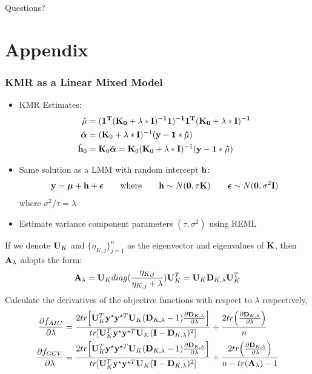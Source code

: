\documentclass{beamer}
\begin{document}
\begin{frame}
\begin{center}
Questions?
\end{center}
\end{frame}


\section{Appendix}

\begin{frame}
\label{est}
\frametitle{KMR as a Linear Mixed Model}
\begin{itemize}
\item KMR Estimates:
\begin{align*}
\hat{\mu} &= (\bf{1}^T ({\bf K}_0 + \lambda * {\bf I})^{-1} \bf{1} )^{-1} 
\bf{1}^T ({\bf K}_0 + \lambda * {\bf I})^{-1} \\
\hat{\boldsymbol{\alpha}} &= ({\bf K}_0 + \lambda * {\bf I})^{-1} ({\bf y} - \bf{1}* \hat{\mu})\\
\hat{{\bf h}}_0 &= {\bf K}_0\hat{\boldsymbol{\alpha}} = 
{\bf K}_0({\bf K}_0 + \lambda * {\bf I})^{-1} ({\bf y} - \bf{1}* \hat{\mu})
\end{align*}
\item Same solution as a LMM with random intercept ${\bf h}$:
\begin{align*}
{\bf y} = \boldsymbol{\mu} + {\bf h} + \boldsymbol{\epsilon} 
\qquad \mbox{where} \qquad
{\bf h} \sim N({\bf 0}, \tau {\bf K}) \qquad 
\boldsymbol{\epsilon} \sim N({\bf 0}, \sigma^2 {\bf I})
\end{align*} 
where $\sigma^2 / \tau = \lambda$
\item Estimate variance component parameters $(\tau, \sigma^2)$ using REML \hyperlink{kmr}{}
\end{itemize}
\end{frame}


\begin{frame}
\label{proof: aic_gcv}
If we denote ${\bf U}_K$ and $\{\eta_{K, j}\}_{j=1}^n$ as the eigenvector and eigenvalues of ${\bf K}$, then ${\bf A}_\lambda$ adopts the form:
$${\bf A}_\lambda={\bf U}_K diag(\frac{\eta_{K, j}}{\eta_{K, j}+\lambda}){\bf U}_K^T={\bf U}_K {\bf D}_{K,\lambda}{\bf U}_K^T$$
Calculate the derivatives of the objective functions with respect to $\lambda$ respectively,
\begin{align}
\frac{\partial f_{AIC}}{\partial \lambda}&=\frac{2tr\Big[{\bf U}_K^T{\bf y}^\star {\bf y}^{\star T}{\bf U}_K({\bf D}_{K, \lambda}-1)\frac{\partial {\bf D}_{K, \lambda}}{\partial \lambda}\Big]}{tr[{\bf U}_K^T{\bf y}^\star {\bf y}^{\star T}{\bf U}_K({\bf I}-{\bf D}_{K, \lambda})^2]}+\frac{2tr\Big(\frac{\partial {\bf D}_{K, \lambda}}{\partial \lambda}\Big)}{n} \label{1} \\
\frac{\partial f_{GCV}}{\partial \lambda}&=\frac{2tr\Big[{\bf U}_K^T{\bf y}^\star {\bf y}^{\star T}{\bf U}_K({\bf D}_{K, \lambda}-1)\frac{\partial {\bf D}_{K, \lambda}}{\partial \lambda}\Big]}{tr[{\bf U}_K^T{\bf y}^\star {\bf y}^{\star T}{\bf U}_K({\bf I}-{\bf D}_{K, \lambda})^2]}+\frac{2tr\Big(\frac{\partial {\bf D}_{K, \lambda}}{\partial \lambda}\Big)}{n-tr({\bf A}_\lambda)-1} \label{2}
\end{align}
\end{frame}
\end{document}
